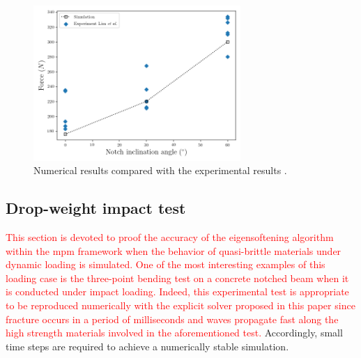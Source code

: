 \documentclass[preprint,12pt,a4paper]{elsarticle}
\newcommand{\PNA}[1]{
  \textcolor{red}{{#1}}
}
\begin{document}
\begin{figure}
  \centering
  \includegraphics[width=0.7\textwidth]{./Figure-Angle-Forces-test}
  \caption{Numerical results compared with the experimental results \cite{LIM_1993}.}
  \label{fig:plot-Angle-Forces-test}
\end{figure}



\subsection{Drop-weight impact test}
\label{sec:3.3}
\PNA{This section is devoted to proof
the accuracy of the eigensoftening algorithm within the \acrshort{mpm} framework when the behavior
of quasi-brittle materials under dynamic loading is simulated. One of the most interesting examples of this
loading case is the three-point bending test on a concrete notched beam when it is conducted under impact loading. Indeed, this experimental test is appropriate to be reproduced numerically with the explicit solver proposed in this paper since
fracture occurs in a period of milliseconds and waves propagate fast along the high strength
materials involved in the aforementioned test.} Accordingly, small time steps are
required to achieve a numerically stable simulation.\\
\end{document}
